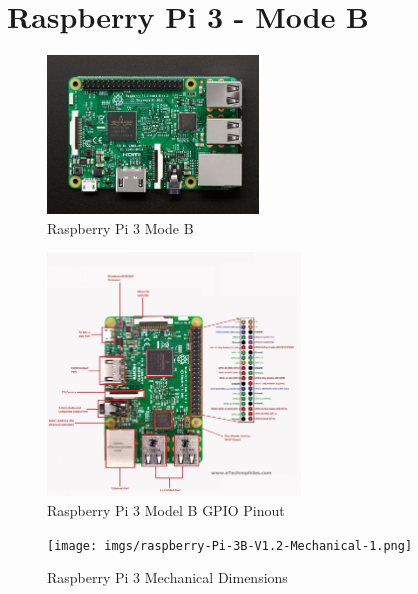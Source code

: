 \documentclass[11pt, oneside]{article}   	%
\begin{document}
\newpage
\section{Raspberry Pi 3 - Mode B}

\begin{figure}[ht]
\centering
\includegraphics[width=0.5\textwidth]{imgs/raspberry-pi-3-model-b.jpeg}
\caption{Raspberry Pi 3 Mode B}
\end{figure}

\begin{figure}[ht]
\centering
\includegraphics[width=0.6\textwidth]{imgs/pinout-of-R-Pi-3-Model-B-GPIO-scaled.jpeg}
\caption{Raspberry Pi 3 Model B GPIO Pinout}
\end{figure}

\begin{figure}[ht]
\centering
\texttt{[image: imgs/raspberry-Pi-3B-V1.2-Mechanical-1.png]}
\caption{Raspberry Pi 3 Mechanical Dimensions }
\end{figure}
\end{document}
